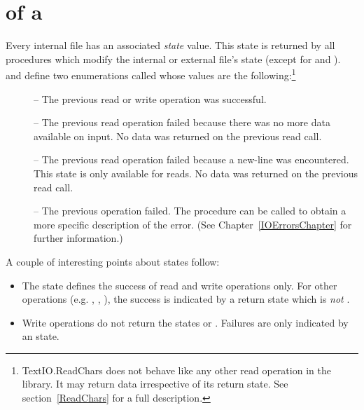 \section{ of a }

Every internal file has an associated {\em state} value.  This
state is returned by all procedures which modify the internal
or external file's state (except for  and ).
 and  define two enumerations
called  whose values are the following:\footnote{
    TextIO.\-Read\-Chars does not behave like any other 
    read operation in the library.  It may return data irrespective
    of its return state.  See section~\ref{ReadChars} for a full
    description.}

\begin{description}
\item[] --
    The previous read or write operation was successful.

\item[] --
    The previous read operation failed because there was no more
    data available on input. No data was returned on
    the previous read call.

\item[] --
    The previous read operation failed because a new-line was encountered.
    This state is only available for  reads. 
    No data was returned on the previous read call.

\item[] --
    The previous operation failed.  The procedure
     can be called to obtain a more specific description
    of the error. (See Chapter~\ref{IOErrorsChapter} for further information.)

\end{description}

A couple of interesting points about states follow:
\begin{itemize}
\item
    The state  defines the success of read and
    write operations only.  For other operations (e.g. ,
    , ), 
    the success is indicated by a return state which is
    {\em not} .
\item
    Write operations do not return the states
     or .
    Failures are only indicated by an  state.
    
\end{itemize}

